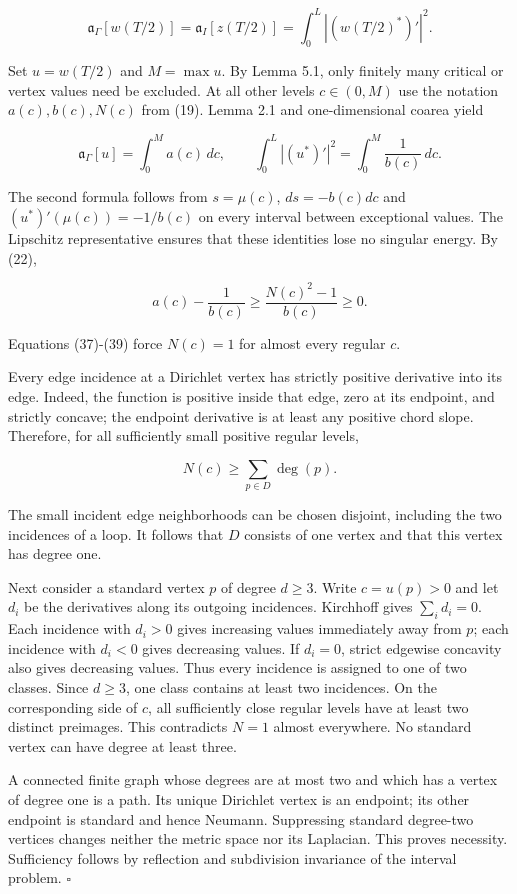 \documentclass[11pt]{article}
\begin{document}
\[
\mathfrak a_\Gamma[w(T/2)]
=\mathfrak a_I[z(T/2)]
=\int_0^L|(w(T/2)^*)'|^2.
\tag{37}
\]

Set \(u=w(T/2)\) and \(M=\max u\). By Lemma 5.1, only finitely many
critical or vertex values need be excluded. At all other levels
\(c\in(0,M)\) use the notation \(a(c),b(c),N(c)\) from (19). Lemma 2.1
and one-dimensional coarea yield

\[
\mathfrak a_\Gamma[u]=\int_0^M a(c)\,dc,
\qquad
\int_0^L|(u^*)'|^2=\int_0^M\frac1{b(c)}\,dc.
\tag{38}
\]

The second formula follows from \(s=\mu(c)\), \(ds=-b(c)dc\) and
\((u^*)'(\mu(c))=-1/b(c)\) on every interval between exceptional values.
The Lipschitz representative ensures that these identities lose no
singular energy. By (22),

\[
a(c)-\frac1{b(c)}\ge\frac{N(c)^2-1}{b(c)}\ge0.
\tag{39}
\]

Equations (37)-(39) force \(N(c)=1\) for almost every regular \(c\).

Every edge incidence at a Dirichlet vertex has strictly positive
derivative into its edge. Indeed, the function is positive inside that
edge, zero at its endpoint, and strictly concave; the endpoint
derivative is at least any positive chord slope. Therefore, for all
sufficiently small positive regular levels,

\[
N(c)\ge\sum_{p\in D}\deg(p).
\tag{40}
\]

The small incident edge neighborhoods can be chosen disjoint, including
the two incidences of a loop. It follows that \(D\) consists of one
vertex and that this vertex has degree one.

Next consider a standard vertex \(p\) of degree \(d\ge3\). Write
\(c=u(p)>0\) and let \(d_i\) be the derivatives along its outgoing
incidences. Kirchhoff gives \(\sum_i d_i=0\). Each incidence with
\(d_i>0\) gives increasing values immediately away from \(p\); each
incidence with \(d_i<0\) gives decreasing values. If \(d_i=0\), strict
edgewise concavity also gives decreasing values. Thus every incidence is
assigned to one of two classes. Since \(d\ge3\), one class contains at
least two incidences. On the corresponding side of \(c\), all
sufficiently close regular levels have at least two distinct preimages.
This contradicts \(N=1\) almost everywhere. No standard vertex can have
degree at least three.

A connected finite graph whose degrees are at most two and which has a
vertex of degree one is a path. Its unique Dirichlet vertex is an
endpoint; its other endpoint is standard and hence Neumann. Suppressing
standard degree-two vertices changes neither the metric space nor its
Laplacian. This proves necessity. Sufficiency follows by reflection and
subdivision invariance of the interval problem. \(\square\)
\end{document}
